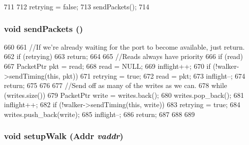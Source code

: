 \begin{DoxyCode}
711 {
712     retrying = false;
713     sendPackets();
714 }
\end{DoxyCode}
\hypertarget{classX86ISA_1_1Walker_1_1WalkerState_aa1322bdadbe5c9c04e2151a8317ab35d}{
\subsubsection[{sendPackets}]{\setlength{\rightskip}{0pt plus 5cm}void sendPackets ()}}
\label{classX86ISA_1_1Walker_1_1WalkerState_aa1322bdadbe5c9c04e2151a8317ab35d}



\begin{DoxyCode}
660 {
661     //If we're already waiting for the port to become available, just return.
662     if (retrying)
663         return;
664 
665     //Reads always have priority
666     if (read) {
667         PacketPtr pkt = read;
668         read = NULL;
669         inflight++;
670         if (!walker->sendTiming(this, pkt)) {
671             retrying = true;
672             read = pkt;
673             inflight--;
674             return;
675         }
676     }
677     //Send off as many of the writes as we can.
678     while (writes.size()) {
679         PacketPtr write = writes.back();
680         writes.pop_back();
681         inflight++;
682         if (!walker->sendTiming(this, write)) {
683             retrying = true;
684             writes.push_back(write);
685             inflight--;
686             return;
687         }
688     }
689 }
\end{DoxyCode}
\hypertarget{classX86ISA_1_1Walker_1_1WalkerState_a002ceab720d63ad3e2b3786c1d2285cc}{
\subsubsection[{setupWalk}]{\setlength{\rightskip}{0pt plus 5cm}void setupWalk ({\bf Addr} {\em vaddr})}}
\label{classX86ISA_1_1Walker_1_1WalkerState_a002ceab720d63ad3e2b3786c1d2285cc}




